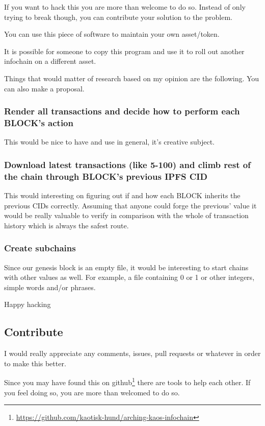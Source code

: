 \documentclass[10pt,a4paper,twocolumn]{paper}
\begin{document}
If you want to hack this you are more than welcome to do so. Instead of only trying to break though, you can contribute your solution to the problem.

You can use this piece of software to maintain your own asset/token.

It is possible for someone to copy this program and use it to roll out another infochain on a different asset.

Things that would matter of research based on my opinion are the following. You can also make a proposal.

\subsubsection{Render all transactions and decide how to perform each BLOCK's action}
	This would be nice to have and use in general, it's creative subject.
	
\subsubsection{Download latest transactions (like 5-100) and climb rest of the chain through BLOCK's previous IPFS CID}
 This would interesting on
	figuring out if and how each BLOCK inherits the previous CIDs
	correctly. Assuming that anyone could forge the previous' value it
	would be really valuable to verify in comparison with the whole of
	transaction history which is always the safest route.
	
\subsubsection{Create subchains}
 Since our genesis block is an empty file, it would be
	interesting to start chains with other values as well. For example, a
	file containing 0 or 1 or other integers, simple words and/or phrases.


Happy hacking


	\subsection{Contribute}\label{contribute}

I would really appreciate any comments, issues, pull requests or whatever in order to make this better.

Since you may have found this on github\footnote{\url{https://github.com/kaotisk-hund/arching-kaos-infochain}} there are tools to help each other. If you feel doing so, you are more than welcomed to do so.
\end{document}
